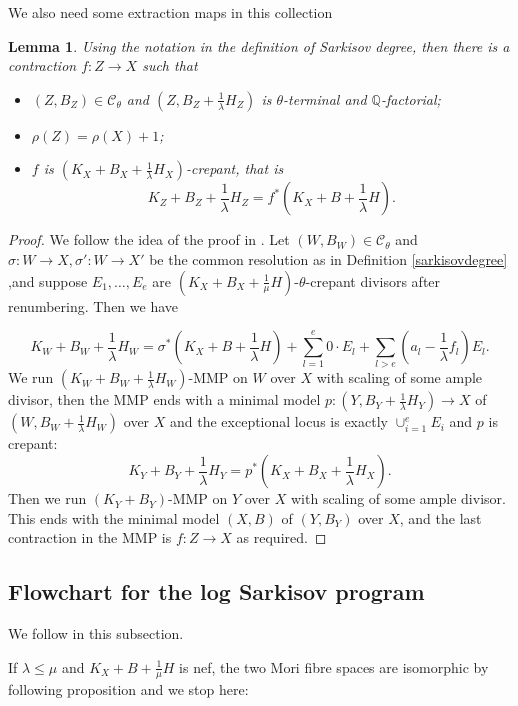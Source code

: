 \documentclass[11pt]{amsart}
\newtheorem{lem}[defn]{Lemma}
\begin{document}
We also need some  extraction maps in this collection 
\begin{lem}\label{thetaextraction}
Using the notation in the definition of Sarkisov degree, then there is a contraction  $f:Z\to X$ such that 
\begin{itemize}
  \item $(Z,B_{Z})\in \mathcal{C}_{\theta}$ and $(Z,B_{Z}+\frac{1}{\lambda}H_{Z})$ is $\theta$-terminal and $\mathbb{Q}$-factorial;
    \item  $\rho(Z)=\rho(X)+1$;
    \item $f$ is $(K_{X}+B_{X}+\frac{1}{\lambda}H_{X})$-crepant, that is 
      \[
        K_{Z}+B_{Z}+\frac{1}{\lambda}H_{Z}=f^*(K_{X}+B+\frac{1}{\lambda}H)
      .\] 
\end{itemize}
\end{lem}
\begin{proof}
  We follow the idea of the proof in \cite[Proposition 1.6]{brunoLogSarkisovProgram1995}.  Let $(W,B_{W})\in \mathcal{C}_{\theta}$ and $\sigma:W\to X,\sigma':W \to X'$ be the common resolution as in Definition \ref{sarkisovdegree} ,and suppose  $E_{1},\ldots ,E_{e}$ are   $(K_{X}+B_{X}+\frac{1}{\mu}H)$-$\theta$-crepant divisors after renumbering. Then we have

\[ K_W+B_W+\frac{1}{\lambda} H_W=\sigma^*(K_X+B+\frac{1}{\lambda} H)+\sum_{l=1}^{e} 0\cdot E_{l}+\sum_{l>e}(a_l-\frac{1}{\lambda} f_l)E_l .\]
We run $(K_{W}+B_{W}+\frac{1}{\lambda}H_{W})$-MMP on $W$ over $X$ with scaling of some ample divisor, then the MMP ends with a minimal model $p:(Y,B_{Y}+\frac{1}{\lambda}H_{Y})\to X$  of $(W,B_{W}+\frac{1}{\lambda}H_{W})$ over $X$ and the exceptional locus is exactly $\cup_{i=1}^{e}E_{i}$ and $p$ is crepant: 
\[
 K_{Y}+B_{Y}+\frac{1}{\lambda}H_{Y}=p^*(K_{X}+B_{X}+\frac{1}{\lambda}H_{X}) 
.\]
Then we run $(K_{Y}+B_{Y})$-MMP on $Y$ over $X$ with scaling of some ample divisor. This ends with the minimal model  $(X,B)$ of $(Y,B_{Y})$ over $X$, and the last contraction  in the MMP is $f:Z\to X$  as required.
\end{proof}
\subsection{Flowchart for the log Sarkisov program}
We follow \cite[Flowchart for the Sarkisov program]{brunoLogSarkisovProgram1995} in this subsection.

If $ \lambda\leqslant\mu $ and $ K_X+B+\frac{1}{\mu}H $ is nef, the two Mori fibre spaces are isomorphic by following proposition and we stop here:
\end{document}
